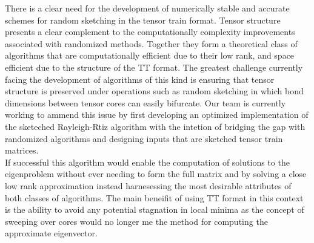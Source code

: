 \documentclass[%
 aip,12pt
 amsmath,amssymb,
 reprint,%
]{revtex4-1}
\begin{document}
There is a clear need for the development of numerically stable and accurate schemes for random sketching in the tensor train format. Tensor structure presents a clear complement to the computationally complexity improvements associated with randomized methods. Together they form a theoretical class of algorithms that are computationally efficient due to their low rank, and space efficient due to the structure of the TT format. The greatest challenge currently facing the development of algorithms of this kind is ensuring that tensor structure is preserved under operations such as random sketching in which bond dimensions between tensor cores can easily bifurcate. Our team is currently working to ammend this issue by first developing an optimized implementation of the sketeched Rayleigh-Rtiz algorithm with the intetion of bridging the gap with randomized algorithms and designing inputs that are sketched tensor train matrices.\\
If successful this algorithm would enable the computation of solutions to the eigenproblem without ever needing to form the full matrix and by solving a close low rank approximation instead harnesessing the most desirable attributes of both classes of algorithms. The main beneifit of using TT format in this context is the ability to avoid any potential stagnation in local minima as the concept of sweeping over cores would no longer me the method for computing the approximate eigenvector.
\end{document}
